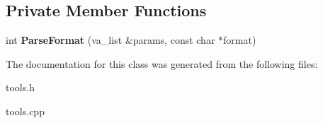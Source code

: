 \subsection*{Private Member Functions}
\begin{DoxyCompactItemize}
\item 
\mbox{\label{class_c_string_print_a7d44210a9575d0951641e215dcf08d69}} 
int {\bfseries Parse\+Format} (va\+\_\+list \&params, const char $\ast$format)
\end{DoxyCompactItemize}


The documentation for this class was generated from the following files\+:\begin{DoxyCompactItemize}
\item 
tools.\+h\item 
tools.\+cpp\end{DoxyCompactItemize}
